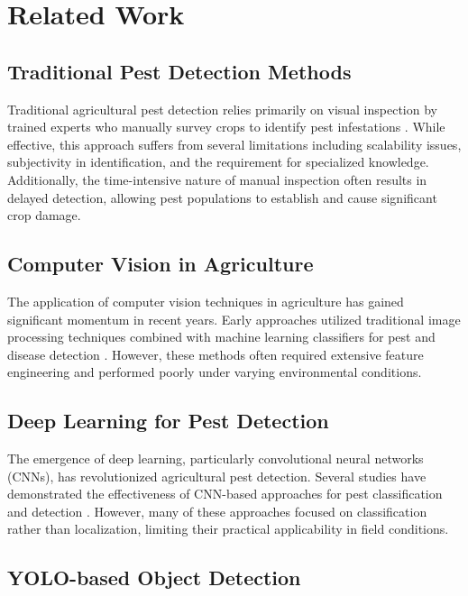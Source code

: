 \documentclass[conference]{IEEEtran}
\begin{document}
\section{Related Work}

\subsection{Traditional Pest Detection Methods}

Traditional agricultural pest detection relies primarily on visual inspection by trained experts who manually survey crops to identify pest infestations \cite{ref4}. While effective, this approach suffers from several limitations including scalability issues, subjectivity in identification, and the requirement for specialized knowledge. Additionally, the time-intensive nature of manual inspection often results in delayed detection, allowing pest populations to establish and cause significant crop damage.

\subsection{Computer Vision in Agriculture}

The application of computer vision techniques in agriculture has gained significant momentum in recent years. Early approaches utilized traditional image processing techniques combined with machine learning classifiers for pest and disease detection \cite{ref5}. However, these methods often required extensive feature engineering and performed poorly under varying environmental conditions.

\subsection{Deep Learning for Pest Detection}

The emergence of deep learning, particularly convolutional neural networks (CNNs), has revolutionized agricultural pest detection. Several studies have demonstrated the effectiveness of CNN-based approaches for pest classification and detection \cite{ref6}. However, many of these approaches focused on classification rather than localization, limiting their practical applicability in field conditions.

\subsection{YOLO-based Object Detection}
\end{document}
